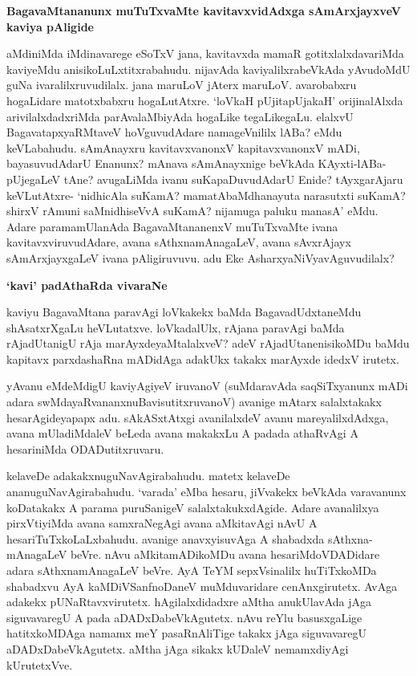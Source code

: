 \newpage

{\bigskip
\noindent
{\large\bf BagavaMtananunx muTuTxvaMte kavitavxvidAdxga sAmArxjayxveV kaviya pAligide}}\label{page183a}
\medskip

\noindent
aMdiniMda iMdinavarege eSoTxV jana, kavitavxda mamaR gotitxlalxdavariMda kaviyeMdu anisikoLuLxtitxrabahudu. nijavAda kaviyalilxrabeVkAda yAvudoMdU guNa ivaralilxruvudilalx. jana maruLoV jAterx maruLoV. avarobabxru hogaLidare matotxbabxru hogaLutAtxre. `loVkaH pUjitapUjakaH'\label{183a} orijinalAlxda arivilalxdadxriMda parAvalaMbiyAda hogaLike tegaLikegaLu. elalxvU BagavatapxyaRMtaveV hoVguvudAdare namageVnililx lABa? eMdu keVLabahudu. sAmAnayxru kavitavxvanonxV kapitavxvanonxV mADi, bayasuvudAdarU Enanunx? mAnava sAmAnayxnige beVkAda KAyxti-lABa-pUjegaLeV tAne? avugaLiMda ivanu suKapaDuvudAdarU Enide? tAyxgarAjaru keVLutAtxre- `nidhicAla suKamA? mamatAbaMdhanayuta narasutxti suKamA? shirxV rAmuni saMnidhiseVvA suKamA? nijamuga paluku manasA' eMdu. Adare paramamUlanAda BagavaMtananenxV muTuTxvaMte ivana kavitavxviruvudAdare, avana sAthxnamAnagaLeV, avana sAvxrAjayx sAmArxjayxgaLeV ivana pAligiruvuvu. adu Eke AsharxyaNiVyavAguvudilalx?

{\bigskip
\noindent
{\large\bf `kavi' padAthaRda vivaraNe}}\label{page184}
\medskip

\noindent
kaviyu BagavaMtana paravAgi loVkakekx baMda BagavadUdxtaneMdu shAsatxrXgaLu heVLutatxve. loVkadalUlx, rAjana paravAgi baMda rAjadUtanigU rAja marAyxdeyaMtalalxveV? adeV rAjadUtanenisikoMDu baMdu kapitavx parxdashaRna mADidAga adakUkx takakx marAyxde idedxV irutetx. 

yAvanu eMdeMdigU kaviyAgiyeV iruvanoV (suMdaravAda saqSiTxyanunx mADi adara swMdayaRvananxnuBavisutitxruvanoV) avanige mAtarx salalxtakakx hesarAgideyapapx adu. sAkASxtAtxgi avanilalxdeV avanu mareyalilxdAdxga, avana mUladiMdaleV beLeda avana makakxLu A padada athaRvAgi A hesariniMda ODADutitxruvaru. 

kelaveDe adakakxnuguNavAgirabahudu. matetx kelaveDe ananuguNavAgirabahudu. `varada' eMba hesaru, jiVvakekx beVkAda varavanunx koDatakakx A parama puruSanigeV salalxtakukxdAgide. Adare avanalilxya pirxVtiyiMda avana samxraNegAgi avana aMkitavAgi nAvU A hesariTuTxkoLaLxbahudu. avanige anavxyisuvAga A shabadxda sAthxna-mAnagaLeV beVre. nAvu aMkitamADikoMDu avana hesariMdoVDADidare adara sAthxnamAnagaLeV beVre. AyA TeYM sepxVsinalilx huTiTxkoMDa shabadxvu AyA kaMDiVSanfnoDaneV muMduvaridare cenAnxgirutetx. AvAga adakekx pUNaRtavxvirutetx. hAgilalxdidadxre aMtha anukUlavAda jAga siguvavaregU A pada aDADxDabeVkAgutetx. nAvu reYlu basusxgaLige hatitxkoMDAga namamx meY pasaRnAliTige takakx jAga siguvavaregU aDADxDabeVkAgutetx. aMtha jAga sikakx kUDaleV nemamxdiyAgi kUrutetxVve. 

